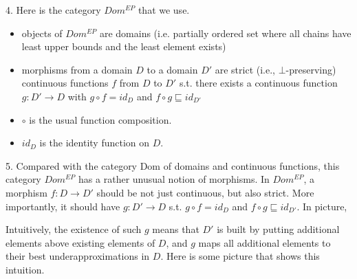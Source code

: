 \documentclass{report}[12pt]
\begin{document}
4. Here is the category $Dom^{EP}$ that we use.
\begin{itemize}
  \item objects of $Dom^{EP}$ are domains (i.e. partially ordered set where all chains have least upper bounds and the least element exists)
  \item morphisms from a domain $D$ to a domain $D'$ are strict (i.e., $\bot$-preserving) continuous functions $f$ from $D$ to $D'$ s.t. there exists a continuous function $g:D'\rightarrow D$ with $g \circ f = id_D$ and $f \circ g \sqsubseteq id_{D'}$
  \item $\circ$ is the usual function composition.
  \item $id_D$ is the identity function on $D$.
\end{itemize}
5. Compared with the category Dom of domains and continuous functions, this category $Dom^{EP}$ has a rather unusual notion of morphisms. In $Dom^{EP}$, a morphism $f:D\rightarrow D'$ should be not just continuous, but also strict. More importantly, it should have $g:D'\rightarrow D$ s.t. $g \circ f = id_D$ and $f \circ g \sqsubseteq id_{D'}$. In picture,
{\center
{}
\par}
Intuitively, the existence of such $g$ means that $D'$ is built by putting additional elements above existing elements of $D$, and $g$ maps all additional elements to their best underapproximations in $D$. Here is some picture that shows this intuition.
\end{document}
